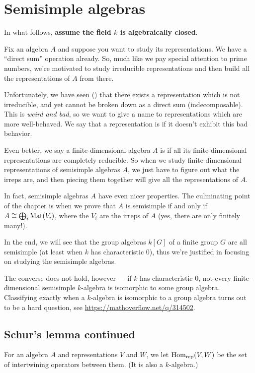 \chapter{Semisimple algebras}
In what follows, \textbf{assume the field $k$ is algebraically closed}.

Fix an algebra $A$ and suppose
you want to study its representations.
We have a ``direct sum'' operation already.
So, much like we pay special attention to prime numbers,
we're motivated to study irreducible representations
and then build all the representations of $A$ from there.

Unfortunately, we have seen ()
that there exists a representation which is not irreducible,
and yet cannot be broken down as a direct sum (indecomposable).
This is \emph{weird and bad}, so we want to give a name
to representations which are more well-behaved.
We say that a representation is 
if it doesn't exhibit this bad behavior.

Even better, we say a finite-dimensional algebra $A$
is  if all its finite-dimensional
representations are completely reducible.
So when we study finite-dimensional representations of
semisimple algebras $A$,
we just have to figure out what the irreps are,
and then piecing them together will give all
the representations of $A$.

In fact, semisimple algebras $A$ have even nicer properties.
The culminating point of the chapter is when we prove that
$A$ is semisimple if and only if $A \cong \bigoplus_i \mathrm{Mat}(V_i)$,
where the $V_i$ are the irreps of $A$
(yes, there are only finitely many!).

In the end, we will see that the group algebras $k[G]$ of a finite group $G$ are
all semisimple (at least when $k$ has characteristic $0$), thus we're justified in
focusing on studying the semisimple algebras.

\begin{remark}
	[Digression]
	The converse does not hold, however --- if $k$ has characteristic $0$, not
	every finite-dimensional semisimple $k$-algebra is isomorphic to some group algebra.
	Classifying exactly when a $k$-algebra is isomorphic to a group algebra
	turns out to be a hard question, see \url{https://mathoverflow.net/q/314502}.
\end{remark}

\section{Schur's lemma continued}
\begin{definition}
	For an algebra $A$ and representations $V$ and $W$,
	we let $\operatorname{Hom}_{\mathrm{rep}}(V,W)$ be the set of intertwining operators between them.
	(It is also a $k$-algebra.)
\end{definition}

